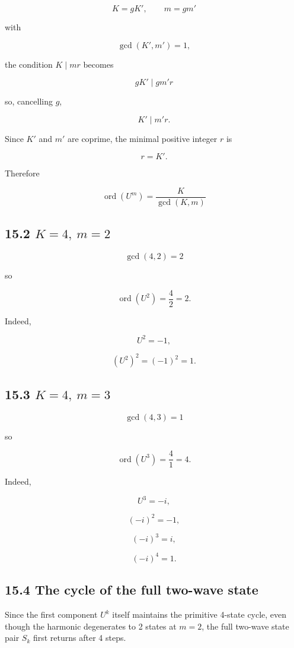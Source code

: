 \documentclass[
  a4paper,
]{article}
\begin{document}
\[
K=gK',
\qquad
m=gm'
\]

with

\[
\gcd(K',m')=1,
\]

the condition \(K\mid mr\) becomes

\[
gK'\mid gm'r
\]

so, cancelling \(g\),

\[
K'\mid m'r.
\]

Since \(K'\) and \(m'\) are coprime, the minimal positive integer \(r\)
is

\[
r=K'.
\]

Therefore

\[
\boxed{
\operatorname{ord}(U^m)
=
\frac{K}{\gcd(K,m)}
}
\]

\subsection{\texorpdfstring{15.2
\(K=4,\ m=2\)}{15.2 K=4,\textbackslash{} m=2}}\label{k4-m2}

\[
\gcd(4,2)=2
\]

so

\[
\operatorname{ord}(U^2)
=
\frac{4}{2}
=2.
\]

Indeed,

\[
U^2=-1,
\]

\[
(U^2)^2=(-1)^2=1.
\]

\subsection{\texorpdfstring{15.3
\(K=4,\ m=3\)}{15.3 K=4,\textbackslash{} m=3}}\label{k4-m3}

\[
\gcd(4,3)=1
\]

so

\[
\operatorname{ord}(U^3)
=
\frac{4}{1}
=4.
\]

Indeed,

\[
U^3=-i,
\]

\[
(-i)^2=-1,
\]

\[
(-i)^3=i,
\]

\[
(-i)^4=1.
\]

\subsection{15.4 The cycle of the full two-wave
state}\label{the-cycle-of-the-full-two-wave-state}

Since the first component \(U^k\) itself maintains the primitive 4-state
cycle, even though the harmonic degenerates to 2 states at \(m=2\), the
full two-wave state pair \(S_k\) first returns after 4 steps.
\end{document}
